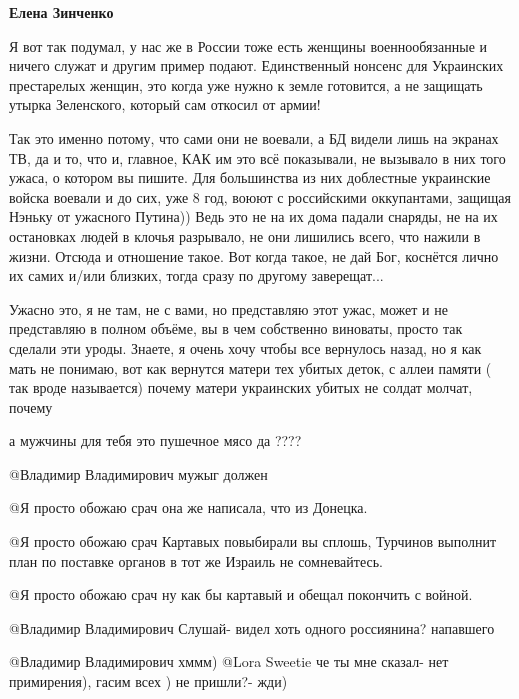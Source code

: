 \begin{itemize} %
\textbf{Елена Зинченко} 

Я вот так подумал, у нас же в России тоже есть женщины военнообязанные и ничего
служат и другим пример подают. Единственный нонсенс для Украинских престарелых
женщин, это когда уже нужно к земле готовится, а не защищать утырка Зеленского,
который сам откосил от армии!


Так это именно потому, что сами они не воевали, а БД видели лишь на экранах ТВ, да
и то, что и, главное, КАК им это всё показывали, не вызывало в них того ужаса, о
котором вы пишите. Для большинства из них доблестные украинские войска воевали и
до сих, уже 8 год, воюют с российскими оккупантами, защищая Нэньку от ужасного
Путина)) Ведь это не на их дома падали снаряды, не на их остановках людей в
клочья разрывало, не они лишились всего, что нажили в жизни. Отсюда и отношение
такое. Вот когда такое, не дай Бог, коснётся лично их самих и/или близких, тогда
сразу по другому заверещат... 


Ужасно это, я не там, не с вами, но представляю этот ужас, может и не
представляю в полном объёме, вы в чем собственно виноваты, просто так сделали
эти уроды. Знаете, я очень хочу чтобы все вернулось назад, но я как мать не
понимаю, вот как вернутся матери тех убитых деток, с аллеи памяти ( так вроде
называется) почему матери украинских убитых не солдат молчат, почему


а мужчины для тебя это пушечное мясо да ????


@Владимир Владимирович  мужыг должен 

 @Я просто обожаю срач  она же написала, что из Донецка.

 @Я просто обожаю срач  Картавых повыбирали вы сплошь, Турчинов выполнит план по поставке органов в тот же Израиль не сомневайтесь.

 @Я просто обожаю срач  ну как бы картавый и обещал покончить с войной.

 @Владимир Владимирович  Слушай- видел хоть одного россиянина? напавшего 


 @Владимир Владимирович  хммм)
 @Lora Sweetie  че ты мне сказал- нет примирения), гасим всех ) не пришли?- жди) 



\end{itemize}

